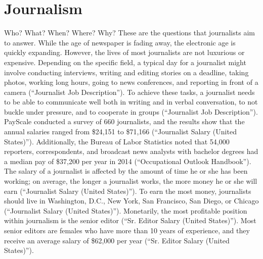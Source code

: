 \chapter{Journalism}

Who? What? When? Where? Why? These are the questions that journalists aim to answer. While the age of newspaper is fading away, the electronic age is quickly expanding. However, the lives of most journalists are not luxurious or expensive. Depending on the specific field, a typical day for a journalist might involve conducting interviews, writing and editing stories on a deadline, taking photos, working long hours, going to news conferences, and reporting in front of a camera (“Journalist Job Description”). To achieve these tasks, a journalist needs to be able to communicate well both in writing and in verbal conversation, to not buckle under pressure, and to cooperate in groups (“Journalist Job Description”). PayScale conducted a survey of 660 journalists, and the results show that the annual salaries ranged from \$24,151 to \$71,166 (“Journalist Salary (United States)”). Additionally, the Bureau of Labor Statistics noted that 54,000 reporters, correspondents, and broadcast news analysts with bachelor degrees had a median pay of \$37,200 per year in 2014 (“Occupational Outlook Handbook”). The salary of a journalist is affected by the amount of time he or she has been working; on average, the longer a journalist works, the more money he or she will earn (“Journalist Salary (United States)”). To earn the most money, journalists should live in Washington, D.C., New York, San Francisco, San Diego, or Chicago (“Journalist Salary (United States)”). Monetarily, the most profitable position within journalism is the senior editor (“Sr. Editor Salary (United States)”). Most senior editors are females who have more than 10 years of experience, and they receive an average salary of \$62,000 per year (“Sr. Editor Salary (United States)”).  

